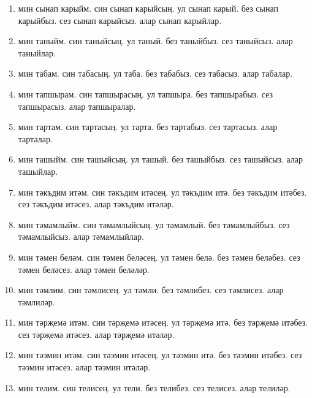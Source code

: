 \documentclass{article}
\begin{document}
\begin{enumerate}
    \item
    мин сынап карыйм.
    син сынап карыйсың.
    ул сынап карый.
    без сынап карыйбыз.
    сез сынап карыйсыз.
    алар сынап карыйлар.

    \item
    мин таныйм.
    син таныйсың.
    ул таный.
    без таныйбыз.
    сез таныйсыз.
    алар таныйлар.

    \item
    мин табам.
    син табасың.
    ул таба.
    без табабыз.
    сез табасыз.
    алар табалар.

    \item
    мин тапшырам.
    син тапшырасың.
    ул тапшыра.
    без тапшырабыз.
    сез тапшырасыз.
    алар тапшыралар.

    \item
    мин тартам.
    син тартасың.
    ул тарта.
    без тартабыз.
    сез тартасыз.
    алар тарталар.

    \item
    мин ташыйм.
    син ташыйсың.
    ул ташый.
    без ташыйбыз.
    сез ташыйсыз.
    алар ташыйлар.

    \item
    мин тәкъдим итәм.
    син тәкъдим итәсең.
    ул тәкъдим итә.
    без тәкъдим итәбез.
    сез тәкъдим итәсез.
    алар тәкъдим итәләр.

    \item
    мин тәмамлыйм.
    син тәмамлыйсың.
    ул тәмамлый.
    без тәмамлыйбыз.
    сез тәмамлыйсыз.
    алар тәмамлыйлар.

    \item
    мин тәмен беләм.
    син тәмен беләсең.
    ул тәмен белә.
    без тәмен беләбез.
    сез тәмен беләсез.
    алар тәмен беләләр.

    \item
    мин тәмлим.
    син тәмлисең.
    ул тәмли.
    без тәмлибез.
    сез тәмлисез.
    алар тәмлиләр.

    \item
    мин тәрҗемә итәм.
    син тәрҗемә итәсең.
    ул тәрҗемә итә.
    без тәрҗемә итәбез.
    сез тәрҗемә итәсез.
    алар тәрҗемә итәләр.

    \item
    мин тәэмин итәм.
    син тәэмин итәсең.
    ул тәэмин итә.
    без тәэмин итәбез.
    сез тәэмин итәсез.
    алар тәэмин итәләр.

    \item
    мин телим.
    син телисең.
    ул тели.
    без телибез.
    сез телисез.
    алар телиләр.


\end{enumerate}
\end{document}
